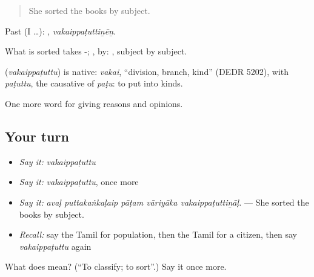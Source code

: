 \begin{quote}
She sorted the books by subject.
\end{quote}

Past (I …): , \emph{vakaippaṭuttiṉēṉ}.

What is sorted takes -; , by:  , subject by subject.

\begin{cousinweb}
\textbf{} (\emph{vakaippaṭuttu}) is native: \emph{vakai}, \textquotedblleft{}division, branch, kind\textquotedblright{} (DEDR 5202), with \emph{paṭuttu}, the causative of \emph{paṭu}: to put into kinds.
\end{cousinweb}

\begin{grammarlens}[title={What you've built}]
One more word for giving reasons and opinions.
\end{grammarlens}

\subsection*{Your turn}
\begin{itemize}
\raggedright
  \item \emph{Say it:} \emph{vakaippaṭuttu}
  \item \emph{Say it:} \emph{vakaippaṭuttu}, once more
  \item \emph{Say it:} \emph{avaḷ puttakaṅkaḷaip pāṭam vāriyāka vakaippaṭuttiṉāḷ.} — She sorted the books by subject.
  \item \emph{Recall:} say the Tamil for population, then the Tamil for a citizen, then say \emph{vakaippaṭuttu} again
\end{itemize}

\begin{tcolorbox}[breakable,colback=teal!4,colframe=teal!35!black,title={Before you move on}]
What does  mean? (\textquotedblleft{}To classify; to sort\textquotedblright{}.) Say it once more.
\end{tcolorbox}
